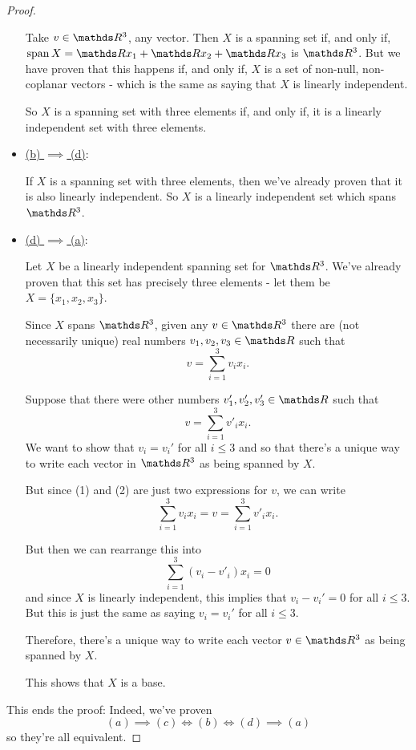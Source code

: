 \begin{proof}
\begin{itemize}
		Take $v\in \R^3$, any vector. Then $X$ is a spanning set if, and only if, $\spen X=\R x_1+\R x_2+\R x_3$ is $\R^3$. But we have proven that this happens if, and only if, $X$ is a set of non-null, non-coplanar vectors - which is the same as saying that $X$ is linearly independent.
		
		So $X$ is a spanning set with three elements if, and only if, it is a linearly independent set with three elements.
		
		\item \underline{(b) $\implies$ (d)}:
		
		If $X$ is a spanning set with three elements, then we've already proven that it is also linearly independent. So $X$ is a linearly independent set which spans $\R^3$.
		
		\item \underline{(d) $\implies$ (a)}:
		
		Let $X$ be a linearly independent spanning set for $\R^3$. We've already proven that this set has precisely three elements - let them be $X=\{x_1,x_2,x_3\}$.
		
		Since $X$ spans $\R^3$, given any $v\in \R^3$ there are (not necessarily unique) real numbers $v_1,v_2,v_3\in\R$ such that
		\begin{equation}
			v=\sum_{i=1}^3v_ix_i.
		\end{equation}
		
		Suppose that there were other numbers $v'_1,v'_2,v'_3\in\R$ such that
		\begin{equation}
			v=\sum_{i=1}^3v'_ix_i.
		\end{equation}We want to show that $v_i=v_i'$ for all $i\leq 3$ and so that there's a unique way to write each vector in $\R^3$ as being spanned by $X$.
		
		But since (1) and (2) are just two expressions for $v$, we can write
		\[\sum_{i=1}^3v_ix_i=v=\sum_{i=1}^3v'_ix_i.\]
		
		But then we can rearrange this into
		\[\sum_{i=1}^3(v_i-v'_i)x_i=0\]and since $X$ is linearly independent, this implies that $v_i-v_i'=0$ for all $i\leq 3$. But this is just the same as saying $v_i=v_i'$ for all $i\leq 3$.
		
		Therefore, there's a unique way to write each vector $v\in\R^3$ as being spanned by $X$.
		
		This shows that $X$ is a base.
	\end{itemize}

This ends the proof: Indeed, we've proven
\[(a)\implies (c)\iff (b)\iff (d)\implies(a)\]so they're all equivalent.
\end{proof}

